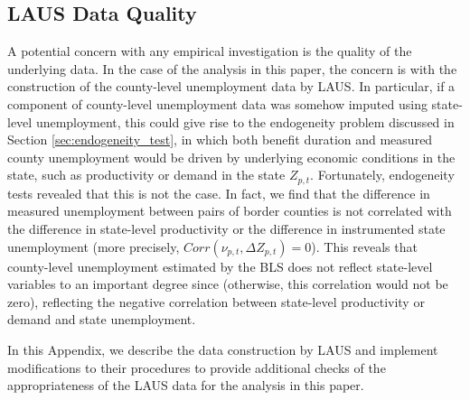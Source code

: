\documentclass[12pt]{article}
\newcommand{\1}{\mathbf{1}}
\begin{document}
\begin{appendix}

\section{LAUS Data Quality}
\label{app:data_quality}
A potential concern with any empirical investigation is the quality of the underlying data. In the case of the analysis in this paper, the concern is with the construction of the county-level unemployment data by LAUS. In particular, if a component of county-level unemployment data was somehow imputed using state-level unemployment, this could give rise to the endogeneity problem discussed in Section \ref{sec:endogeneity_test}, in which both benefit duration and measured county unemployment would be driven by underlying economic conditions in the state, such as productivity or demand in the state $Z_{p,t}$. Fortunately, endogeneity tests revealed that this is not the case. In fact, we find that the difference in measured unemployment between pairs of border counties is not correlated with the difference in state-level productivity or the difference in instrumented state unemployment (more precisely, $Corr (\nu_{p,t}, \Delta Z_{p,t}) = 0$). This reveals that county-level unemployment estimated by the BLS does not reflect state-level variables to an important degree since (otherwise, this correlation would not be zero), reflecting the negative correlation between state-level productivity or demand and state unemployment.



In this Appendix, we describe the data construction by LAUS and implement modifications to their procedures to provide additional checks of the appropriateness of the LAUS data for the analysis in this paper.


\end{appendix}
\end{document}
